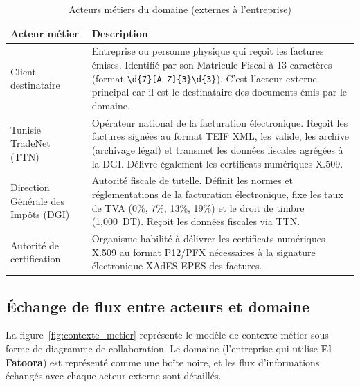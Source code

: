 \documentclass[a4paper,12pt]{report}
\newcommand{\elfattoora}{\textbf{El Fatoora}}
\begin{document}
\begin{table}[htbp]
\centering
\caption{Acteurs métiers du domaine (externes à l'entreprise)}
\label{tab:acteurs_metier}
\begin{tabularx}{\textwidth}{|l|X|}
\hline
\textbf{Acteur métier} & \textbf{Description} \\
\hline
Client destinataire & Entreprise ou personne physique qui reçoit les factures émises. Identifié par son Matricule Fiscal à 13 caractères (format \texttt{\textbackslash d\{7\}[A-Z]\{3\}\textbackslash d\{3\}}). C'est l'acteur externe principal car il est le destinataire des documents émis par le domaine. \\
\hline
Tunisie TradeNet (TTN) & Opérateur national de la facturation électronique. Reçoit les factures signées au format TEIF XML, les valide, les archive (archivage légal) et transmet les données fiscales agrégées à la DGI. Délivre également les certificats numériques X.509. \\
\hline
Direction Générale des Impôts (DGI) & Autorité fiscale de tutelle. Définit les normes et réglementations de la facturation électronique, fixe les taux de TVA (0\%, 7\%, 13\%, 19\%) et le droit de timbre (1,000~DT). Reçoit les données fiscales via TTN. \\
\hline
Autorité de certification & Organisme habilité à délivrer les certificats numériques X.509 au format P12/PFX nécessaires à la signature électronique XAdES-EPES des factures. \\
\hline
\end{tabularx}
\end{table}

\subsection{Échange de flux entre acteurs et domaine}

La figure~\ref{fig:contexte_metier} représente le modèle de contexte métier sous forme de diagramme de collaboration. Le domaine (l'entreprise qui utilise \elfattoora{}) est représenté comme une boîte noire, et les flux d'informations échangés avec chaque acteur externe sont détaillés.
\end{document}
